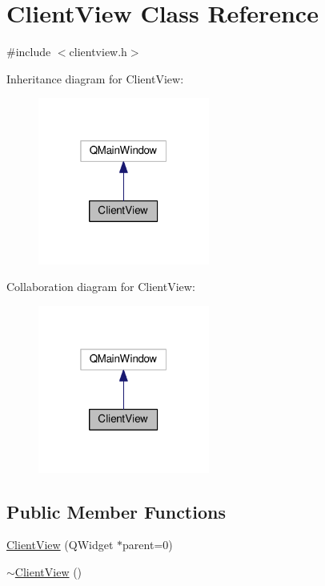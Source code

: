 \hypertarget{class_client_view}{}\section{Client\+View Class Reference}
\label{class_client_view}


{\ttfamily \#include $<$clientview.\+h$>$}



Inheritance diagram for Client\+View\+:
\nopagebreak
\begin{figure}[H]
\begin{center}
\leavevmode
\includegraphics[width=160pt]{class_client_view__inherit__graph}
\end{center}
\end{figure}


Collaboration diagram for Client\+View\+:
\nopagebreak
\begin{figure}[H]
\begin{center}
\leavevmode
\includegraphics[width=160pt]{class_client_view__coll__graph}
\end{center}
\end{figure}
\subsection*{Public Member Functions}
\begin{DoxyCompactItemize}
\item 
\hyperlink{class_client_view_ac9429879f2af8ef8c4b683e9714f34ce}{Client\+View} (Q\+Widget $\ast$parent=0)
\item 
\hyperlink{class_client_view_aaa165e70f6c1faa7707fb4c19e2cdcfc}{$\sim$\+Client\+View} ()
\end{DoxyCompactItemize}


